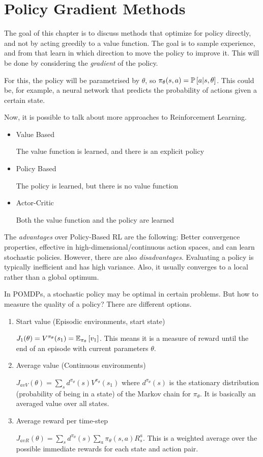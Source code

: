 \chapter{Policy Gradient Methods}

The goal of this chapter is to discuss methods that optimize for policy directly, and not by acting greedily to a value function. The goal is to sample experience, and from that learn in which direction to move the policy to improve it. This will be done by considering the \textit{gradient} of the policy.

For this, the policy will be parametrised by $\theta$, so $\pi_\theta(s, a) = \operatorname{\mathbb{P}}\left[a |s, \theta\right]$. This could be, for example, a neural network that predicts the probability of actions given a certain state.

Now, it is possible to talk about more approaches to Reinforcement Learning. 
\begin{itemize}
	\item Value Based
	
	The value function is learned, and there is an explicit policy
	\item Policy Based
	
	The policy is learned, but there is no value function
	\item Actor-Critic
	
	Both the value function and the policy are learned
\end{itemize}

The \textit{advantages} over Policy-Based RL are the following: Better convergence properties, effective in high-dimensional/continuous action spaces, and can learn stochastic policies. However, there are also \textit{disadvantages}. Evaluating a policy is typically inefficient and has high variance. Also, it usually converges to a local rather than a global optimum.

In POMDPs, a stochastic policy may be optimal in certain problems. But how to measure the quality of a policy? There are different options.
\begin{enumerate}
	\item Start value (Episodic environments, start state)
	
	$J_1(\theta) = V^{\pi_\theta}(s_1) = \operatorname{\mathbb{E}}_{\pi_\theta}\left[v_1\right]$. This means it is a measure of reward until the end of an episode with current parameters $\theta$.
	\item Average value (Continuous environments)
	
	$J_{avV}(\theta) = \sum_s d^{\pi_\theta}(s) V^{\pi_\theta}(s_1)$ where $d^{\pi_\theta}(s)$ is the stationary distribution (probability of being in a state) of the Markov chain for $\pi_\theta$. It is basically an averaged value over all states.
	\item Average reward per time-step
	
	$J_{avR}(\theta) = \sum_s d^{\pi_\theta}(s) \sum_a \pi_\theta(s, a) R^a_s$. This is a weighted average over the possible immediate rewards for each state and action pair.
\end{enumerate}

